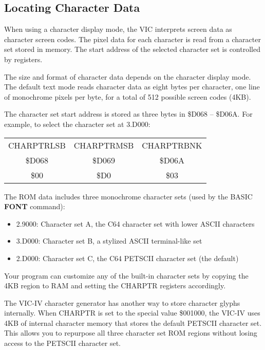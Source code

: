 \subsection{Locating Character Data}

When using a character display mode, the VIC interprets screen data as character screen codes. The pixel data for each character is read from a character set stored in memory. The start address of the selected character set is controlled by registers.

The size and format of character data depends on the character display mode. The default text mode reads character data as eight bytes per character, one line of monochrome pixels per byte, for a total of 512 possible screen codes (4KB).

The character set start address is stored as three bytes in \$D068 -- \$D06A. For example, to select the character set at 3.D000:

\begin{center}
\begin{tabular}{|c|c|c|}
\hline
CHARPTRLSB & CHARPTRMSB & CHARPTRBNK \\
\$D068 & \$D069 & \$D06A \\
\hline
\$00 & \$D0 & \$03 \\
\hline
\end{tabular}
\end{center}

The ROM data includes three monochrome character sets (used by the BASIC {\bf FONT} command):

\begin{itemize}
\item 2.9000: Character set A, the C64 character set with lower ASCII characters
\item 3.D000: Character set B, a stylized ASCII terminal-like set
\item 2.D000: Character set C, the C64 PETSCII character set (the default)
\end{itemize}

Your program can customize any of the built-in character sets by copying the 4KB region to RAM and setting the CHARPTR registers accordingly.

The VIC-IV character generator has another way to store character glyphs internally. When CHARPTR is set to the special value \$001000, the VIC-IV uses 4KB of internal character memory that stores the default PETSCII character set. This allows you to repurpose all three character set ROM regions without losing access to the PETSCII character set.

